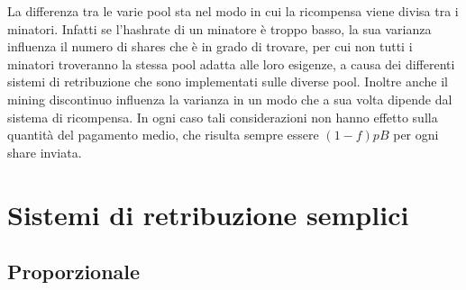 La differenza tra le varie pool sta nel modo in cui la ricompensa viene divisa tra i minatori. Infatti se l'hashrate di un minatore è troppo basso, la sua varianza influenza il numero di shares che è in grado di trovare, per cui non tutti i minatori troveranno la stessa pool adatta alle loro esigenze, a causa dei differenti sistemi di retribuzione che sono implementati sulle diverse pool. Inoltre anche il mining discontinuo influenza la varianza in un modo che a sua volta dipende dal sistema di ricompensa.
In ogni caso tali considerazioni non hanno effetto sulla quantità del pagamento medio, che risulta sempre essere $(1-f)pB$ per ogni share inviata.

\section{Sistemi di retribuzione semplici}

\subsection{Proporzionale}\label{pool-proporzionale}

